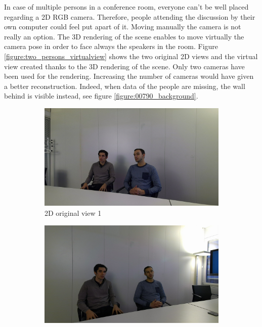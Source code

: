  In case of multiple persons in a conference room,  everyone can't be well placed regarding a 2D RGB camera.  Therefore, people attending the discussion by their own computer could feel put apart of it. Moving manually the camera is not really an option. The 3D rendering of the scene enables to move virtually the camera pose in order to face always the speakers in the room. Figure \ref{figure:two_persons_virtualview} shows the two original 2D views and the virtual view created thanks to the 3D rendering of the scene. Only two cameras have been used for the rendering. Increasing the number of cameras would have given a better reconstruction. Indeed, when data of the people are missing, the wall behind is visible instead, see figure \ref{figure:00790_background}.
 
 \begin{figure}[H]
\centering
  \begin{subfigure}[b]{0.48 \textwidth}
    \includegraphics[width=\textwidth]{images/scenario/00790_master.jpg}
    \caption{2D original view 1}
    \label{figure:00790_master}
  \end{subfigure}
  \hfill
  \begin{subfigure}[b]{0.48 \textwidth}
    \includegraphics[width=\textwidth]{images/scenario/00790_sub.jpg}

\end{subfigure}
\end{figure}
